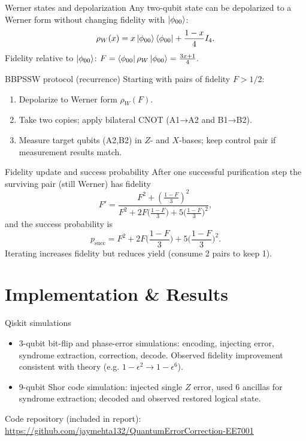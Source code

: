 \documentclass[10pt]{beamer}
\begin{document}
\begin{frame}{Werner states and depolarization}
  Any two-qubit state can be depolarized to a Werner form without changing fidelity with \(\ket{\phi_{00}}\):
  \[
    \rho_W(x)= x\ket{\phi_{00}}\bra{\phi_{00}} + \frac{1-x}{4} I_4.
  \]
  Fidelity relative to \(\ket{\phi_{00}}\): \(F=\bra{\phi_{00}}\rho_W\ket{\phi_{00}}=\frac{3x+1}{4}.\)
\end{frame}

\begin{frame}{BBPSSW protocol (recurrence)}
  Starting with pairs of fidelity \(F>1/2\):
  \begin{enumerate}
    \item Depolarize to Werner form \(\rho_W(F)\).
    \item Take two copies; apply bilateral CNOT (A1→A2 and B1→B2).
    \item Measure target qubits (A2,B2) in \(Z\)- and \(X\)-bases; keep control pair if measurement results match.
  \end{enumerate}
\end{frame}

\begin{frame}{Fidelity update and success probability}
  After one successful purification step the surviving pair (still Werner) has fidelity
  \[
    F'=\frac{F^2 + \left(\tfrac{1-F}{3}\right)^2}{F^2 + 2F\big(\tfrac{1-F}{3}\big) + 5\big(\tfrac{1-F}{3}\big)^2},
  \]
  and the success probability is
  \[
    p_{\text{succ}} = F^2 + 2F\Big(\frac{1-F}{3}\Big) + 5\Big(\frac{1-F}{3}\Big)^2.
  \]
  Iterating increases fidelity but reduces yield (consume 2 pairs to keep 1).
\end{frame}

\section{Implementation \& Results}
\begin{frame}{Qiskit simulations}
  \begin{itemize}
    \item 3-qubit bit-flip and phase-error simulations: encoding, injecting error, syndrome extraction, correction, decode. Observed fidelity improvement consistent with theory (e.g. \(1-\epsilon^2 \to 1-\epsilon^6\)).
    \item 9-qubit Shor code simulation: injected single \(Z\) error, used 6 ancillas for syndrome extraction; decoded and observed restored logical state.
  \end{itemize}
  Code repository (included in report): \\
  \small \url{https://github.com/jaymehta132/QuantumErrorCorrection-EE7001}
\end{frame}
\end{document}
